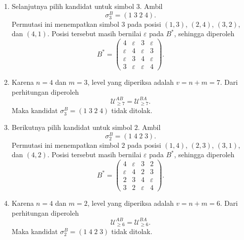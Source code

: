 \begin{contoh}
\begin{enumerate}
    \item Selanjutnya pilih kandidat untuk simbol $3$. Ambil
          \[
            \sigma_3^B=(1\;3\;2\;4).
          \]
          Permutasi ini menempatkan simbol $3$ pada posisi
          $(1,3)$, $(2,4)$, $(3,2)$, dan $(4,1)$. Posisi tersebut masih
          bernilai $\varepsilon$ pada $B^*$, sehingga diperoleh
          \[
            B^*=
            \begin{pmatrix}
              4           & \varepsilon & 3           & \varepsilon \\
              \varepsilon & 4           & \varepsilon & 3           \\
              \varepsilon & 3           & 4           & \varepsilon \\
              3           & \varepsilon & \varepsilon & 4
            \end{pmatrix}.
          \]

    \item Karena $n=4$ dan $m=3$, level yang diperiksa adalah $v=n+m=7$.
          Dari perhitungan diperoleh
          \[
            \mathcal{U}_{\ge 7}^{AB}
            =
            \mathcal{U}_{\ge 7}^{BA}.
          \]
          Maka kandidat $\sigma_3^B=(1\;3\;2\;4)$ tidak ditolak.

    \item Berikutnya pilih kandidat untuk simbol $2$. Ambil
          \[
            \sigma_2^B=(1\;4\;2\;3).
          \]
          Permutasi ini menempatkan simbol $2$ pada posisi
          $(1,4)$, $(2,3)$, $(3,1)$, dan $(4,2)$. Posisi tersebut masih
          bernilai $\varepsilon$ pada $B^*$, sehingga diperoleh
          \[
            B^*=
            \begin{pmatrix}
              4           & \varepsilon & 3           & 2           \\
              \varepsilon & 4           & 2           & 3           \\
              2           & 3           & 4           & \varepsilon \\
              3           & 2           & \varepsilon & 4
            \end{pmatrix}.
          \]

    \item Karena $n=4$ dan $m=2$, level yang diperiksa adalah $v=n+m=6$.
          Dari perhitungan diperoleh
          \[
            \mathcal{U}_{\ge 6}^{AB}
            =
            \mathcal{U}_{\ge 6}^{BA}.
          \]
          Maka kandidat $\sigma_2^B=(1\;4\;2\;3)$ tidak ditolak.


\end{enumerate}
\end{contoh}
